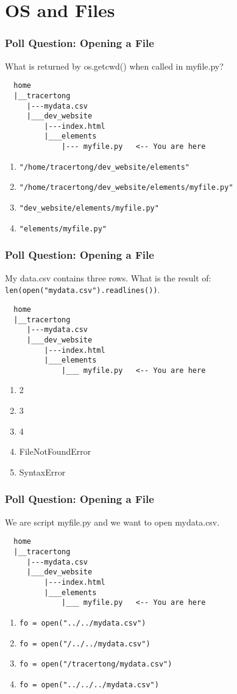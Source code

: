 \documentclass[xcolor=table]{beamer}
\begin{document}
\section{OS and Files}

%
%
\begin{frame}[fragile]
  \frametitle{Poll Question: Opening a File}
  What is returned by os.getcwd() when called in myfile.py?
  \begin{lstlisting}
  home
  |__tracertong
     |---mydata.csv
     |___dev_website
         |---index.html
         |___elements
             |--- myfile.py   <-- You are here
  \end{lstlisting} 
  \vfill
  \begin{enumerate}[A]
    \item \lstinline|"/home/tracertong/dev_website/elements"|
    \item \lstinline|"/home/tracertong/dev_website/elements/myfile.py"|
    \item \lstinline|"dev_website/elements/myfile.py"|
    \item \lstinline|"elements/myfile.py"|
  \end{enumerate}
\end{frame}

%
%
\begin{frame}[fragile]
  \frametitle{Poll Question: Opening a File}
  My data.csv contains three rows. What is the result of: \lstinline|len(open("mydata.csv").readlines())|.
  \begin{lstlisting}
  home
  |__tracertong
     |---mydata.csv
     |___dev_website
         |---index.html
         |___elements
             |___ myfile.py   <-- You are here
  \end{lstlisting} 
  \vfill
  \begin{enumerate}[A]
    \item 2
    \item 3
    \item 4
    \item FileNotFoundError
    \item SyntaxError
  \end{enumerate}
\end{frame}

%
%
\begin{frame}[fragile]
  \frametitle{Poll Question: Opening a File}
  We are script myfile.py and we want to open mydata.csv.
  \begin{lstlisting}
  home
  |__tracertong
     |---mydata.csv
     |___dev_website
         |---index.html
         |___elements
             |___ myfile.py   <-- You are here
  \end{lstlisting} 
  \vfill
  \begin{enumerate}[A]
    \item \lstinline|fo = open("../../mydata.csv")|
    \item \lstinline|fo = open("/../../mydata.csv")|
    \item \lstinline|fo = open("/tracertong/mydata.csv")|
    \item \lstinline|fo = open("../../../mydata.csv")|
  \end{enumerate}
\end{frame}
\end{document}

